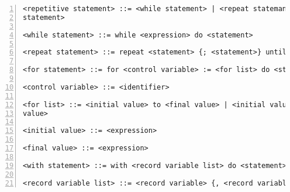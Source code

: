 \begin{Verbatim}[numbers=left]
<repetitive statement> ::= <while statement> | <repeat statemant> | <for
statement>

<while statement> ::= while <expression> do <statement>

<repeat statement> ::= repeat <statement> {; <statement>} until <expression>

<for statement> ::= for <control variable> := <for list> do <statement>

<control variable> ::= <identifier>

<for list> ::= <initial value> to <final value> | <initial value> downto <final
value>

<initial value> ::= <expression>

<final value> ::= <expression>

<with statement> ::= with <record variable list> do <statement>

<record variable list> ::= <record variable> {, <record variable>} 
\end{Verbatim}